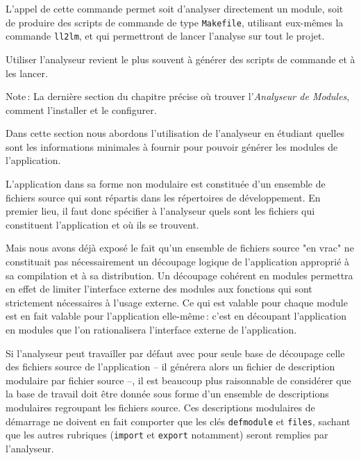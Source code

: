L'appel de cette commande permet soit d'analyser directement
un module, soit de produire 
des scripts de commande de type {\tt Makefile}, utilisant
eux-m\^{e}mes la commande {\tt ll2lm}, et 
qui permettront de lancer l'analyse sur tout le projet.

Utiliser l'analyseur revient le plus souvent
\`{a} g\'{e}n\'{e}rer des scripts de commande et \`{a} les lancer.

\begin{Side}{Note\,:}
La derni\`{e}re section du chapitre pr\'{e}cise o\`{u} trouver
l'{\em Analyseur de Modules}, comment l'installer et le
configurer.
\end{Side}



Dans cette section nous abordons l'utilisation de l'analyseur en 
\'{e}tudiant quelles sont les informations minimales \`{a} fournir pour
pouvoir g\'{e}n\'{e}rer les modules de l'application.

L'application dans sa forme non modulaire est constitu\'{e}e d'un
ensemble de fichiers source qui sont r\'{e}partis dans les
r\'{e}pertoires de d\'{e}veloppement.
En premier lieu, il faut donc sp\'{e}cifier \`{a} l'analyseur quels
sont les fichiers qui constituent l'application et o\`{u} ils
se trouvent.

Mais nous avons d\'{e}j\`{a} expos\'{e} le fait qu'un ensemble de fichiers
source "en vrac" ne constituait pas n\'{e}cessairement un d\'{e}coupage
logique de l'application appropri\'{e} \`{a} sa compilation
et \`{a} sa distribution. 
Un d\'{e}coupage coh\'{e}rent en modules permettra
en effet de limiter l'interface externe des modules
aux fonctions qui sont strictement n\'{e}cessaires \`{a} l'usage externe.
Ce qui est valable pour chaque module est en fait
valable pour l'application elle-m\^{e}me\,: c'est en
d\'{e}coupant l'application en modules que l'on rationalisera
l'interface externe de l'application.


Si l'analyseur peut travailler par d\'{e}faut avec pour seule
base de d\'{e}coupage celle des fichiers source de l'application -- il
g\'{e}n\'{e}rera alors un fichier de description modulaire par
fichier source --, il est beaucoup plus raisonnable de consid\'{e}rer
que la base de travail doit \^{e}tre donn\'{e}e sous
forme d'un ensemble de descriptions modulaires regroupant
les fichiers source.
Ces descriptions modulaires de d\'{e}marrage ne doivent en fait
comporter que les cl\'{e}s {\tt defmodule} et {\tt files}, 
sachant que les autres rubriques ({\tt import} et {\tt export}
notamment) seront remplies par l'analyseur.


